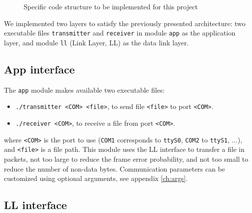 \documentclass[a4paper, 11pt]{report}
\begin{document}
\begin{figure}[H]
	\caption{Specific code structure to be implemented for this project}
\end{figure}

We implemented two layers to satisfy the previously presented architecture: two executable files \texttt{transmitter} and \texttt{receiver} in module \texttt{app} as the application layer, and module \texttt{ll} (Link Layer, LL) as the data link layer.

\subsection{App interface}

The \texttt{app} module makes available two executable files:
\begin{itemize}
	\itemsep0em
	\item \texttt{./transmitter <COM> <file>}, to send file \texttt{<file>} to port \texttt{<COM>}.
	\item \texttt{./receiver <COM>}, to receive a file from port \texttt{<COM>}.
\end{itemize}
where \texttt{<COM>} is the port to use (\texttt{COM1} corresponds to \texttt{ttyS0}, \texttt{COM2} to \texttt{ttyS1}, ...), and \texttt{<file>} is a file path. This module uses the LL interface to transfer a file in packets, not too large to reduce the frame error probability, and not too small to reduce the number of non-data bytes. Communication parameters can be customized using optional arguments, see appendix \ref{ch:args}.

\subsection{LL interface}
\end{document}
